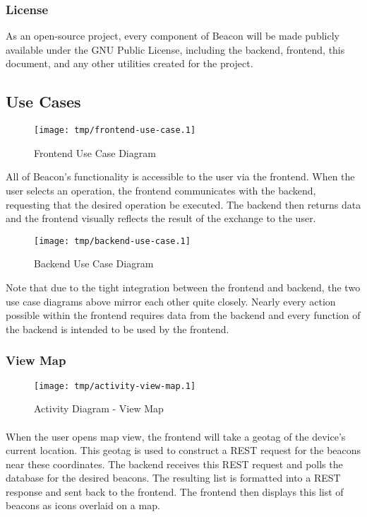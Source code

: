        \subsubsection{License}
        As an open-source project, every component of Beacon will be made publicly
        available under the GNU Public License, including the backend, frontend, this
        document, and any other utilities created for the project.

    \subsection{Use Cases}
        \begin{figure}[H]
            \centering
            \texttt{[image: tmp/frontend-use-case.1]} 
            \caption{Frontend Use Case Diagram}
        \end{figure}

        All of Beacon's functionality is accessible to the user via the frontend.
        When the user selects an operation, the frontend communicates with
        the backend, requesting that the desired operation be executed. The backend
        then returns data and the frontend visually reflects the result of the
        exchange to the user.

        \begin{figure}[H]
            \centering
            \texttt{[image: tmp/backend-use-case.1]} 
            \caption{Backend Use Case Diagram}
        \end{figure}

        Note that due to the tight integration between the frontend and backend,
        the two use case diagrams above mirror each other quite closely.
        Nearly every action possible within the frontend requires data from the
        backend and every function of the backend is intended to be used by the
        frontend.

        \subsubsection{View Map}
        \begin{figure}[H]
            \centering
            \texttt{[image: tmp/activity-view-map.1]} 
            \caption{Activity Diagram - View Map}
        \end{figure}

        \paragraph*{}
        When the user opens map view, the frontend will take a geotag of the device's
        current location. This geotag is used to construct a REST request
        for the beacons near these coordinates.
        The backend receives this REST request and polls the database for the desired
        beacons. The resulting list is formatted into a REST response and sent back
        to the frontend. The frontend then displays this list of beacons as icons
        overlaid on a map.

